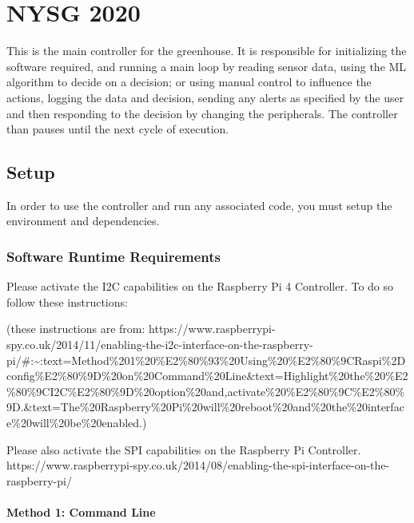 \documentclass[
]{article}
\author{}
\date{}
\begin{document}
\hypertarget{nysg-2020}{%
\section{NYSG 2020}\label{nysg-2020}}

This is the main controller for the greenhouse. It is responsible for
initializing the software required, and running a main loop by reading
sensor data, using the ML algorithm to decide on a decision; or using
manual control to influence the actions, logging the data and decision,
sending any alerts as specified by the user and then responding to the
decision by changing the peripherals. The controller than pauses until
the next cycle of execution.

\hypertarget{setup}{%
\subsection{Setup}\label{setup}}

In order to use the controller and run any associated code, you must
setup the environment and dependencies.

\hypertarget{software-runtime-requirements}{%
\subsubsection{Software Runtime
Requirements}\label{software-runtime-requirements}}

Please activate the I2C capabilities on the Raspberry Pi 4 Controller.
To do so follow these instructions:

(these instructions are from:
https://www.raspberrypi-spy.co.uk/2014/11/enabling-the-i2c-interface-on-the-raspberry-pi/\#:\textasciitilde:text=Method\%201\%20\%E2\%80\%93\%20Using\%20\%E2\%80\%9CRaspi\%2Dconfig\%E2\%80\%9D\%20on\%20Command\%20Line\&text=Highlight\%20the\%20\%E2\%80\%9CI2C\%E2\%80\%9D\%20option\%20and,activate\%20\%E2\%80\%9C\%E2\%80\%9D.\&text=The\%20Raspberry\%20Pi\%20will\%20reboot\%20and\%20the\%20interface\%20will\%20be\%20enabled.)

Please also activate the SPI capabilities on the Raspberry Pi
Controller.
https://www.raspberrypi-spy.co.uk/2014/08/enabling-the-spi-interface-on-the-raspberry-pi/

\hypertarget{method-1-command-line}{%
\paragraph{Method 1: Command Line}\label{method-1-command-line}}
\end{document}
